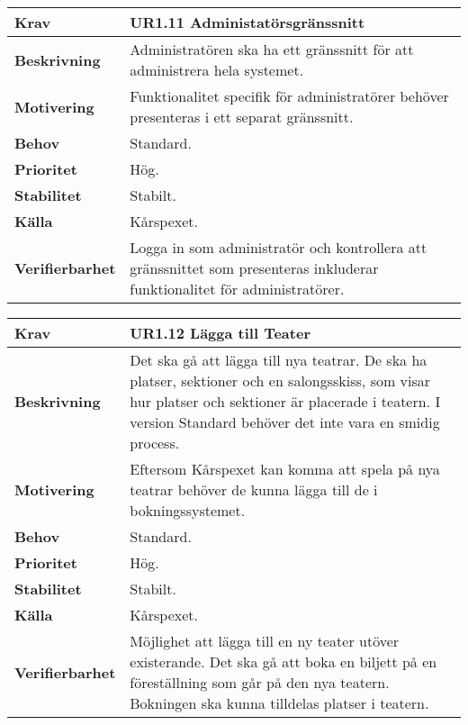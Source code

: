\documentclass[a4paper, twoside, 11pt, titlepage]{article}
\begin{document}
		\begin {table} [ht] \begin{tabular} { p{2.6cm} p{12.5cm} }
			\hline
			{\sffamily\textbf{Krav}} & {\sffamily\textbf{UR1.11 Administatörsgränssnitt }} \\
			\hline
			{\sffamily\textbf{Beskrivning}} & {Administratören ska ha ett gränssnitt för att administrera hela systemet.} \\
			\hline
			{\sffamily\textbf{Motivering}} & {Funktionalitet specifik för administratörer behöver presenteras i ett separat gränssnitt.} \\
			\hline
			{\sffamily\textbf{Behov}} & {Standard.} \\
			\hline
			{\sffamily\textbf{Prioritet}} & {Hög.} \\
			\hline
			{\sffamily\textbf{Stabilitet}} & {Stabilt.} \\
			\hline
			{\sffamily\textbf{Källa}} & {Kårspexet.} \\
			\hline
			{\sffamily\textbf{Verifierbarhet}} & {Logga in som administratör och kontrollera att gränssnittet som presenteras inkluderar funktionalitet för administratörer.} \\
			\hline
		\end{tabular} \end{table} \FloatBarrier
		\vspace{6mm}

		\begin {table} [ht] \begin{tabular} { p{2.6cm} p{12.5cm} }
			\hline
			{\sffamily\textbf{Krav}} & {\sffamily\textbf{UR1.12 Lägga till Teater }} \\
			\hline
			{\sffamily\textbf{Beskrivning}} & {Det ska gå att lägga till nya teatrar. De ska ha platser, sektioner och en salongsskiss, som visar hur platser och sektioner är placerade i teatern. I version Standard behöver det inte vara en smidig process.} \\
			\hline
			{\sffamily\textbf{Motivering}} & {Eftersom Kårspexet kan komma att spela på nya teatrar behöver de kunna lägga till de i bokningssystemet.} \\
			\hline
			{\sffamily\textbf{Behov}} & {Standard.} \\
			\hline
			{\sffamily\textbf{Prioritet}} & {Hög.} \\
			\hline
			{\sffamily\textbf{Stabilitet}} & {Stabilt.} \\
			\hline
			{\sffamily\textbf{Källa}} & {Kårspexet.} \\
			\hline
			{\sffamily\textbf{Verifierbarhet}} & {Möjlighet att lägga till en ny teater utöver existerande. Det ska gå att boka en biljett på en föreställning som går på den nya teatern. Bokningen ska kunna tilldelas platser i teatern.} \\
			\hline
		\end{tabular} \end{table} \FloatBarrier
		\vspace{6mm}
\end{document}
